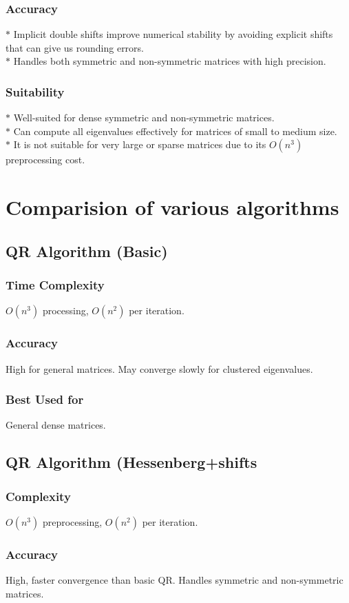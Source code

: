 \documentclass[a4paper,12pt]{article}
\begin{document}
 \subsubsection{Accuracy}
 $*$ Implicit double shifts improve numerical stability by avoiding explicit shifts that can give us rounding errors.\\
 $*$ Handles both symmetric and non-symmetric matrices with high precision.\\
 \subsubsection{Suitability}
 $*$ Well-suited for dense symmetric and non-symmetric matrices.\\
 $*$ Can compute all eigenvalues effectively for matrices of small to medium size.\\
 $*$ It is not suitable for very large or sparse matrices due to its $O(n^3)$ preprocessing cost.
 \section{Comparision of various algorithms}
\subsection{QR Algorithm (Basic)}
\subsubsection{Time Complexity}
$O(n^3)$ processing, $O(n^2)$ per iteration.
\subsubsection{Accuracy}
High for general matrices. May converge slowly for clustered eigenvalues.
\subsubsection{Best Used for}
General dense matrices.
\subsection{QR Algorithm (Hessenberg+shifts}
\subsubsection{Complexity}
$O(n^3)$ preprocessing, $O(n^2)$ per iteration.
\subsubsection{Accuracy}
High, faster convergence than basic QR. Handles symmetric and non-symmetric matrices.
\end{document}
